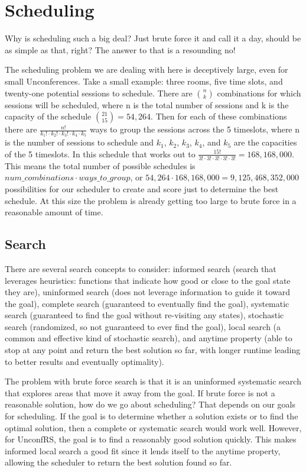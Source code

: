 \chapter{Scheduling}
Why is scheduling such a big deal? Just brute force it and call it a day, should be as simple as that, right? The answer to that is a resounding no!

The scheduling problem we are dealing with here is deceptively large, even for small Unconferences. Take a small example: three rooms, five time slots, and twenty-one potential sessions to schedule. There are $\binom{n}{k}$ combinations for which sessions will be scheduled, where n is the total number of sessions and k is the capacity of the schedule $\binom{21}{15}=54,264$. Then for each of these combinations there are $\frac{n!}{k_1! \cdot k_2! \cdot k_3! \cdot k_4 \cdot k_5}$ ways to group the sessions across the 5 timeslots, where n is the number of sessions to schedule and $k_1$, $k_2$, $k_3$, $k_4$, and $k_5$ are the capacities of the 5 timeslots. In this schedule that works out to $\frac{15!}{3! \cdot 3! \cdot 3! \cdot 3! \cdot 3!}=168,168,000$. This means the total number of possible schedules is $num\_combinations \cdot ways\_to\_group$, or $54,264 \cdot 168,168,000=9,125,468,352,000$ possibilities for our scheduler to create and score just to determine the best schedule. At this size the problem is already getting too large to brute force in a reasonable amount of time. 

\section{Search}
There are several search concepts to consider: informed search (search that leverages heuristics: functions that indicate how good or close to the goal state they are), uninformed search (does not leverage information to guide it toward the goal), complete search (guaranteed to eventually find the goal), systematic search (guaranteed to find the goal without re-visiting any states), stochastic search (randomized, so not guaranteed to ever find the goal), local search (a common and effective kind of stochastic search), and anytime property (able to stop at any point and return the best solution so far, with longer runtime leading to better results and eventually optimality).

The problem with brute force search is that it is an uninformed systematic search that explores areas that move it away from the goal. If brute force is not a reasonable solution, how do we go about scheduling? That depends on our goals for scheduling. If the goal is to determine whether a solution exists or to find the optimal solution, then a complete or systematic search would work well. However, for UnconfRS, the goal is to find a reasonably good solution quickly. This makes informed local search a good fit since it lends itself to the anytime property, allowing the scheduler to return the best solution found so far.
%
%
